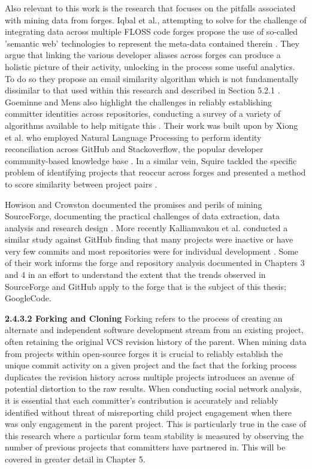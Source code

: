 Also relevant to this work is the research that focuses on the pitfalls associated with mining data from forges. Iqbal et al., attempting to solve for the challenge of integrating data across multiple FLOSS code forges propose the use of so-called 'semantic web' technologies to represent the meta-data contained therein \citep{iqbal2012integrating}. They argue that linking the various developer aliases across forges can produce a holistic picture of their activity, unlocking in the process some useful analytics. To do so they propose an email similarity algorithm which is not fundamentally dissimilar to that used within this research and described in Section 5.2.1 \citep{iqbal2015large}. Goeminne and Mens also highlight the challenges in reliably establishing committer identities across repositories, conducting a survey of a variety of algorithms available to help mitigate this \citep{goeminne2013comparison}. Their work was built upon by Xiong et al. who employed Natural Language Processing to perform identity reconciliation across GitHub and Stackoverflow, the popular developer community-based knowledge base \citep{xiong2017mining, github, stackoverflow}. In a similar vein, Squire tackled the specific problem of identifying projects that reoccur across forges and presented a method to score similarity between project pairs \citep{squire2009integrating}.

Howison and Crowston documented the promises and perils of mining SourceForge, documenting the practical challenges of data extraction, data analysis and research design \citep{howison2004perils}. More recently Kalliamvakou et al. conducted a similar study against GitHub finding that many projects were inactive or have very few commits and most repositories were for individual development \citep{kalliamvakou2014promises}. Some of their work informs the forge and repository analysis documented in Chapters 3 and 4 in an effort to understand the extent that the trends observed in SourceForge and GitHub apply to the forge that is the subject of this thesis; GoogleCode.

\newline
\textbf{2.4.3.2 Forking and Cloning}
\newline
Forking refers to the process of creating an alternate and independent software development stream from an existing project, often retaining the original VCS revision history of the parent. When mining data from projects within open-source forges it is crucial to reliably establish the unique commit activity on a given project and the fact that the forking process duplicates the revision history across multiple projects introduces an avenue of potential distortion to the raw results. When conducting social network analysis, it is essential that each committer's contribution is accurately and reliably identified without threat of misreporting child project engagement when there was only engagement in the parent project. This is particularly true in the case of this research where a particular form team stability is measured by observing the number of previous projects that committers have partnered in. This will be covered in greater detail in Chapter 5.

